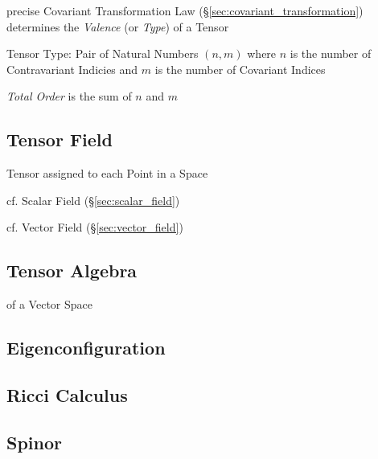 precise Covariant Transformation Law
(\S\ref{sec:covariant_transformation}) determines the \emph{Valence}
(or \emph{Type}) of a Tensor

Tensor Type: Pair of Natural Numbers $(n,m)$ where $n$ is the number
of Contravariant Indicies and $m$ is the number of Covariant Indices

\emph{Total Order} is the sum of $n$ and $m$



\subsection{Tensor Field}\label{sec:tensor_field}

Tensor assigned to each Point in a Space

cf. Scalar Field (\S\ref{sec:scalar_field})

cf. Vector Field (\S\ref{sec:vector_field})



\subsection{Tensor Algebra}\label{sec:tensor_algebra}

of a Vector Space



\subsection{Eigenconfiguration}\label{sec:eigenconfiguration}

\subsection{Ricci Calculus}\label{sec:ricci_calculus}

\subsection{Spinor}\label{sec:spinor}



